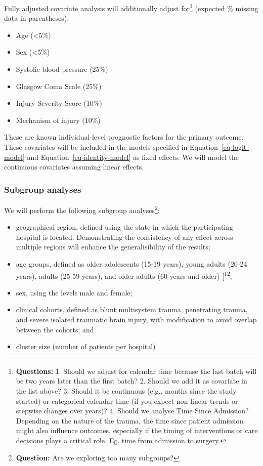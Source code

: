 \documentclass[
]{scrartcl}
\providecommand{\tightlist}{%
  \setlength{\itemsep}{0pt}\setlength{\parskip}{0pt}}\usepackage{longtable,booktabs,array}
\begin{document}
Fully adjusted covariate analysis will additionally adjust
for\footnote{\textbf{Questions:} 1. Should we adjust for calendar time
  because the last batch will be two years later than the first batch?
  2. Should we add it as covariate in the list above? 3. Should it be
  continuous (e.g., months since the study started) or categorical
  calendar time (if you expect non-linear trends or stepwise changes
  over years)? 4. Should we analyse Time Since Admission? Depending on
  the nature of the trauma, the time since patient admission might also
  influence outcomes, especially if the timing of interventions or care
  decisions plays a critical role. Eg. time from admission to surgery.}
(expected \% missing data in parentheses):

\begin{itemize}
\tightlist
\item
  Age (\textless5\%)
\item
  Sex (\textless5\%)
\item
  Systolic blood pressure (25\%)
\item
  Glasgow Coma Scale (25\%)
\item
  Injury Severity Score (10\%)
\item
  Mechanism of injury (10\%)
\end{itemize}

These are known individual-level prognostic factors for the primary
outcome. These covariates will be included in the models specified in
Equation~\ref{eq-logit-model} and Equation~\ref{eq-identity-model} as
fixed effects. We will model the continuous covariates assuming linear
effects.

\hypertarget{subgroup-analyses}{%
\subsubsection{Subgroup analyses}\label{subgroup-analyses}}

We will perform the following subgroup analyses\footnote{\textbf{Question:}
  Are we exploring too many subgroups?}:

\begin{itemize}
\tightlist
\item
  geographical region, defined using the state in which the
  participating hospital is located. Demonstrating the consistency of
  any effect across multiple regions will enhance the generalisibility
  of the results;
\item
  age groups, defined as older adolescents (15-19 years), young adults
  (20-24 years), adults (25-59 years), and older adults (60 years and
  older) {[}\textsuperscript{12};
\item
  sex, using the levels male and female;
\item
  clinical cohorts, defined as blunt multisystem trauma, penetrating
  trauma, and severe isolated traumatic brain injury, with modification
  to avoid overlap between the cohorts; and
\item
  cluster size (number of patients per hospital)
\end{itemize}
\end{document}
